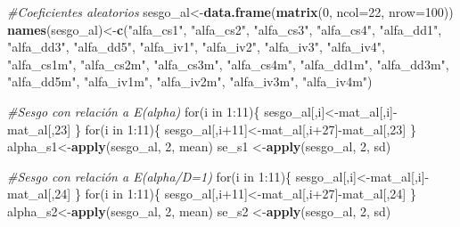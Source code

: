 \documentclass[]{article}
\newenvironment{Shaded}{\begin{snugshade}}{\end{snugshade}}
\newcommand{\KeywordTok}[1]{\textcolor[rgb]{0.13,0.29,0.53}{\textbf{{#1}}}}
\newcommand{\DataTypeTok}[1]{\textcolor[rgb]{0.13,0.29,0.53}{{#1}}}
\newcommand{\DecValTok}[1]{\textcolor[rgb]{0.00,0.00,0.81}{{#1}}}
\newcommand{\StringTok}[1]{\textcolor[rgb]{0.31,0.60,0.02}{{#1}}}
\newcommand{\CommentTok}[1]{\textcolor[rgb]{0.56,0.35,0.01}{\textit{{#1}}}}
\newcommand{\NormalTok}[1]{{#1}}
\begin{document}
\begin{Shaded}
\begin{Highlighting}[]
\CommentTok{#Coeficientes aleatorios}
\NormalTok{sesgo_al<-}\KeywordTok{data.frame}\NormalTok{(}\KeywordTok{matrix}\NormalTok{(}\DecValTok{0}\NormalTok{, }\DataTypeTok{ncol=}\DecValTok{22}\NormalTok{, }\DataTypeTok{nrow=}\DecValTok{100}\NormalTok{))}
\KeywordTok{names}\NormalTok{(sesgo_al)<-}\KeywordTok{c}\NormalTok{(}\StringTok{"alfa_cs1"}\NormalTok{, }\StringTok{"alfa_cs2"}\NormalTok{, }\StringTok{"alfa_cs3"}\NormalTok{, }\StringTok{"alfa_cs4"}\NormalTok{, }\StringTok{"alfa_dd1"}\NormalTok{,}
                \StringTok{"alfa_dd3"}\NormalTok{, }\StringTok{"alfa_dd5"}\NormalTok{, }\StringTok{"alfa_iv1"}\NormalTok{, }\StringTok{"alfa_iv2"}\NormalTok{, }\StringTok{"alfa_iv3"}\NormalTok{,}
                \StringTok{"alfa_iv4"}\NormalTok{, }\StringTok{"alfa_cs1m"}\NormalTok{, }\StringTok{"alfa_cs2m"}\NormalTok{, }\StringTok{"alfa_cs3m"}\NormalTok{, }\StringTok{"alfa_cs4m"}\NormalTok{,}
                \StringTok{"alfa_dd1m"}\NormalTok{, }\StringTok{"alfa_dd3m"}\NormalTok{, }\StringTok{"alfa_dd5m"}\NormalTok{, }\StringTok{"alfa_iv1m"}\NormalTok{, }\StringTok{"alfa_iv2m"}\NormalTok{,}
                \StringTok{"alfa_iv3m"}\NormalTok{, }\StringTok{"alfa_iv4m"}\NormalTok{)}

\CommentTok{#Sesgo con relación a E(alpha)}
\NormalTok{for(i in }\DecValTok{1}\NormalTok{:}\DecValTok{11}\NormalTok{)\{}
  \NormalTok{sesgo_al[,i]<-mat_al[,i]-mat_al[,}\DecValTok{23}\NormalTok{]}
\NormalTok{\}}
\NormalTok{for(i in }\DecValTok{1}\NormalTok{:}\DecValTok{11}\NormalTok{)\{}
  \NormalTok{sesgo_al[,i}\DecValTok{+11}\NormalTok{]<-mat_al[,i}\DecValTok{+27}\NormalTok{]-mat_al[,}\DecValTok{23}\NormalTok{]}
\NormalTok{\}}
\NormalTok{alpha_s1<-}\KeywordTok{apply}\NormalTok{(sesgo_al, }\DecValTok{2}\NormalTok{, mean)}
\NormalTok{se_s1   <-}\KeywordTok{apply}\NormalTok{(sesgo_al, }\DecValTok{2}\NormalTok{, sd)}

\CommentTok{#Sesgo con relación a E(alpha/D=1)}
\NormalTok{for(i in }\DecValTok{1}\NormalTok{:}\DecValTok{11}\NormalTok{)\{}
  \NormalTok{sesgo_al[,i]<-mat_al[,i]-mat_al[,}\DecValTok{24}\NormalTok{]}
\NormalTok{\}}
\NormalTok{for(i in }\DecValTok{1}\NormalTok{:}\DecValTok{11}\NormalTok{)\{}
  \NormalTok{sesgo_al[,i}\DecValTok{+11}\NormalTok{]<-mat_al[,i}\DecValTok{+27}\NormalTok{]-mat_al[,}\DecValTok{24}\NormalTok{]}
\NormalTok{\}}
\NormalTok{alpha_s2<-}\KeywordTok{apply}\NormalTok{(sesgo_al, }\DecValTok{2}\NormalTok{, mean)}
\NormalTok{se_s2   <-}\KeywordTok{apply}\NormalTok{(sesgo_al, }\DecValTok{2}\NormalTok{, sd)}


\end{Highlighting}
\end{Shaded}
\end{document}
